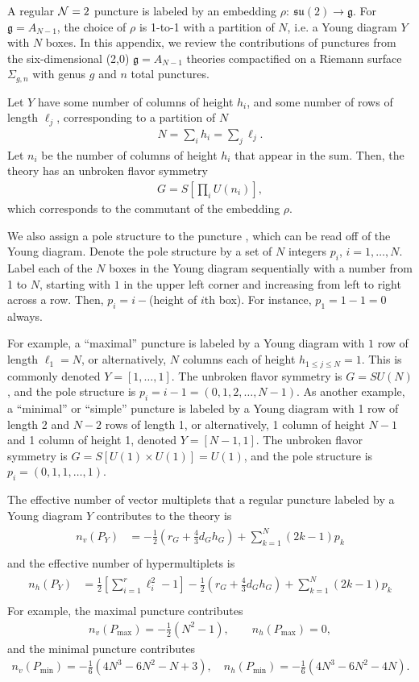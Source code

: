 \documentclass[a4paper,11pt]{article}
\newcommand{\ba}[1]{\begin{align} #1 \end{align} }
\newcommand{\bs}[1]{\begin{split} #1 \end{split} }
\def\CN{{\cal N}}
\begin{document}
A regular $\CN=2$ puncture is labeled by an embedding $\rho:\ \mathfrak{su}(2)\to \mathfrak{g}$. For $\mathfrak{g}=A_{N-1}$, the choice of $\rho$ is 1-to-1 with a partition of $N$, i.e. a Young diagram $Y$ with $N$ boxes. In this appendix, we review the contributions of punctures from the six-dimensional (2,0) $\mathfrak{g}=A_{N-1}$ theories compactified on a Riemann surface $\Sigma_{g,n}$ with genus $g$ and $n$ total punctures.



Let $Y$ have some number of columns of height $h_i$, and some number of rows of length $\ell_j$, corresponding to a partition of $N$  
	\ba{
	N = \sum_{i} h_i= \sum_{j} \ell_j.
	}
Let $n_i$ be the number of columns of height $h_i$ that appear in the sum. Then, the theory has an unbroken flavor symmetry
	\ba{
	G=S\left[\prod_iU(n_i)\right],
	}
which corresponds to the commutant of the embedding $\rho$. 

We also assign a pole structure to the puncture \cite{Gaiotto:2009we}, which can be read off of the Young diagram. Denote the pole structure by a set of $N$ integers $p_i$, $i=1,\dots, N$. Label each of the $N$ boxes in the Young diagram sequentially with a number from 1 to $N$, starting with $1$ in the upper left corner and increasing from left to right across a row. Then, $p_i=i-$(height of $i$th box). For instance, $p_1=1-1=0$ always.
	
For example, a ``maximal'' puncture is labeled by a Young diagram with $1$ row of length $\ell_1=N$, or alternatively, $N$ columns each of height $h_{1\leq j\leq N}=1$. This is commonly denoted $Y=[1,\dots,1]$. The unbroken flavor symmetry is $G=SU(N)$, and the pole structure is $p_i=i-1=(0,1,2,\dots,N-1)$. As another example, a ``minimal'' or ``simple'' puncture is labeled by a Young diagram with 1 row of length 2 and $N-2$ rows of length 1, or alternatively, 1 column of height $N-1$ and 1 column of height 1, denoted $Y=[N-1,1]$. The unbroken flavor symmetry is $G=S[U(1)\times U(1)]= U(1)$, and the pole structure is $p_i = (0,1,1,\dots,1)$. 

The effective number of vector multiplets that a regular puncture labeled by a Young diagram $Y$ contributes to the theory is \cite{Gaiotto:2009gz,Chacaltana:2010ks}
	\ba{\bs{
	n_v(P_Y)&=  -\frac{1}{2}\left( r_G + \frac{4}{3}d_Gh_G\right)+ \sum_{k=1}^N(2k-1)p_k \\
	}\label{eq:nvy}}
and the effective number of hypermultiplets is 
	\ba{\bs{
	n_h(P_Y)&= \frac{1}{2}\left[ \sum_{i=1}^r\ell_i^2 -1\right]- \frac{1}{2}\left( r_G + \frac{4}{3}d_Gh_G\right)+ \sum_{k=1}^N(2k-1)p_k \\
	}\label{eq:nhy}}
For example, the maximal puncture contributes
	\ba{
	n_v(P_{\text{max}}) =-\frac{1}{2}(N^2-1),\qquad n_h(P_{\text{max}})=0, \label{eq:max} 
	}
and the minimal puncture contributes
	\ba{
	n_v(P_{\text{min}}) =-\frac{1}{6}(4N^3-6N^2-N+3),\quad n_h(P_{\text{min}})=-\frac{1}{6} (4N^3-6N^2-4N). \label{eq:minans}
	}
\end{document}
